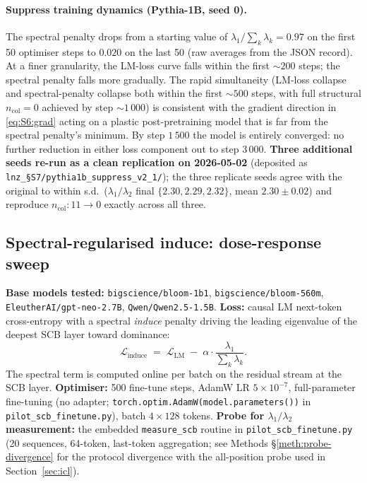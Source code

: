 \documentclass[11pt,a4paper]{article}
\begin{document}
\paragraph{Suppress training dynamics (Pythia-1B, seed 0).}
The spectral penalty drops from a starting value of
$\lambda_1/\sum_k\lambda_k\!=\!0.97$ on the first 50 optimiser steps
to $0.020$ on the last 50 (raw averages from the JSON record). At a
finer granularity, the LM-loss curve falls within the first
$\sim\!200$ steps; the spectral penalty falls more gradually. The
rapid simultaneity (LM-loss collapse and spectral-penalty collapse
both within the first $\sim\!500$ steps, with full structural
$n_\mathrm{col}\!=\!0$ achieved by step $\sim\!1\,000$) is consistent
with the gradient direction in \eqref{eq:S6:grad} acting on a
plastic post-pretraining model that is far from the spectral
penalty's minimum. By step $1\,500$ the model is entirely converged:
no further reduction in either loss component out to step 3\,000.
\textbf{Three additional seeds re-run as a clean replication on
2026-05-02} (deposited as \texttt{lnz\_§S7/pythia1b\_suppress\_v2\_1/});
the three replicate seeds agree with the original to within s.d.\
($\lambda_1/\lambda_2$ final $\{2.30, 2.29, 2.32\}$,
mean $2.30 \pm 0.02$) and reproduce $n_\mathrm{col}\!:\!11\!\to\!0$
exactly across all three.

\subsection{Spectral-regularised induce: dose-response sweep}

\textbf{Base models tested:} \texttt{bigscience/bloom-1b1},
\texttt{bigscience/bloom-560m}, \texttt{EleutherAI/gpt-neo-2.7B},
\texttt{Qwen/Qwen2.5-1.5B}.
\textbf{Loss:} causal LM next-token cross-entropy with a spectral
\emph{induce} penalty driving the leading eigenvalue of the deepest
SCB layer toward dominance:
\begin{equation}
  \mathcal{L}_\mathrm{induce} \;=\;
  \mathcal{L}_\mathrm{LM} \;-\; \alpha \cdot
  \frac{\lambda_1}{\sum_k \lambda_k}.
\end{equation}
The spectral term is computed online per batch on the residual stream
at the SCB layer.
\textbf{Optimiser:} 500 fine-tune steps, AdamW LR
$5 \times 10^{-7}$, full-parameter fine-tuning (no adapter;
\texttt{torch.optim.AdamW(model.parameters())} in
\texttt{pilot\_scb\_finetune.py}), batch $4 \times 128$ tokens.
\textbf{Probe for $\lambda_1/\lambda_2$ measurement:} the embedded
\texttt{measure\_scb} routine in \texttt{pilot\_scb\_finetune.py}
(20 sequences, 64-token, last-token aggregation; see Methods
\S\ref{meth:probe-divergence} for the protocol divergence with the
all-position probe used in Section~\ref{sec:icl}).
\end{document}
